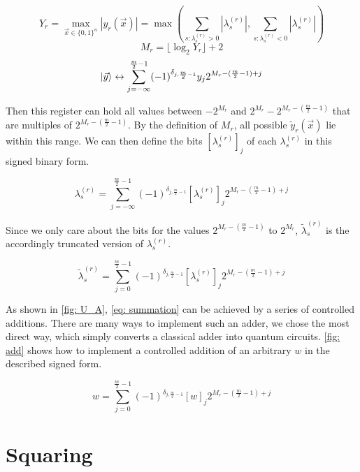 \begin{equation}
    Y_r = \max_{\vec{x} \in \{0, 1\}^n} |y_r(\vec{x})| = \max\left(\sum_{s : \lambda^{(r)}_s > 0} |\lambda^{(r)}_s|, \sum_{s : \lambda^{(r)}_s < 0} |\lambda^{(r)}_s|\right)
\end{equation}
\begin{equation}
    M_r = \lfloor \log_2{Y_r} \rfloor + 2
\end{equation}
\begin{equation}
    \ket{\vec{y}} \leftrightarrow \sum_{j = -\infty}^{\frac{m}{2} - 1} (-1)^{\delta_{j, \frac{m}{2} - 1}}y_j2^{M_r - (\frac{m}{2} - 1) + j}
\end{equation}

Then this register can hold all values between $-2^{M_r}$ and $2^{M_r} - 2^{M_r - (\frac{m}{2} - 1)}$ that are multiples of $2^{M_r - (\frac{m}{2} - 1)}$. By the definition of $M_r$, all possible $\tilde{y}_r(\vec{x})$ lie within this range. We can then define the bits $[\lambda^{(r)}_s]_j$ of each $\lambda^{(r)}_s$ in this signed binary form.

\begin{equation}
    \lambda^{(r)}_s = \sum_{j = -\infty}^{\frac{m}{2} - 1} (-1)^{\delta_{j, \frac{m}{2} - 1}}[\lambda^{(r)}_s]_j2^{M_r - (\frac{m}{2} - 1) + j}
\end{equation}

Since we only care about the bits for the values $2^{M_r - (\frac{m}{2} - 1)}$ to $2^{M_r}$, $\tilde{\lambda}^{(r)}_s$ is the accordingly truncated version of $\lambda^{(r)}_s$.

\begin{equation}
    \tilde{\lambda}^{(r)}_s = \sum_{j = 0}^{\frac{m}{2} - 1} (-1)^{\delta_{j, \frac{m}{2} - 1}}[\lambda^{(r)}_s]_j2^{M_r - (\frac{m}{2} - 1) + j}
\end{equation}

As shown in \ref{fig: U_A}, \eqref{eq: summation} can be achieved by a series of controlled additions. There are many ways to implement such an adder, we chose the most direct way, which simply converts a classical adder into quantum circuits. \ref{fig: add} shows how to implement a controlled addition of an arbitrary $w$ in the described signed form.

\begin{equation}
    w = \sum_{j = 0}^{\frac{m}{2} - 1} (-1)^{\delta_{j, \frac{m}{2} - 1}}[w]_j2^{M_r - (\frac{m}{2} - 1) + j}
\end{equation}

\section{Squaring}

